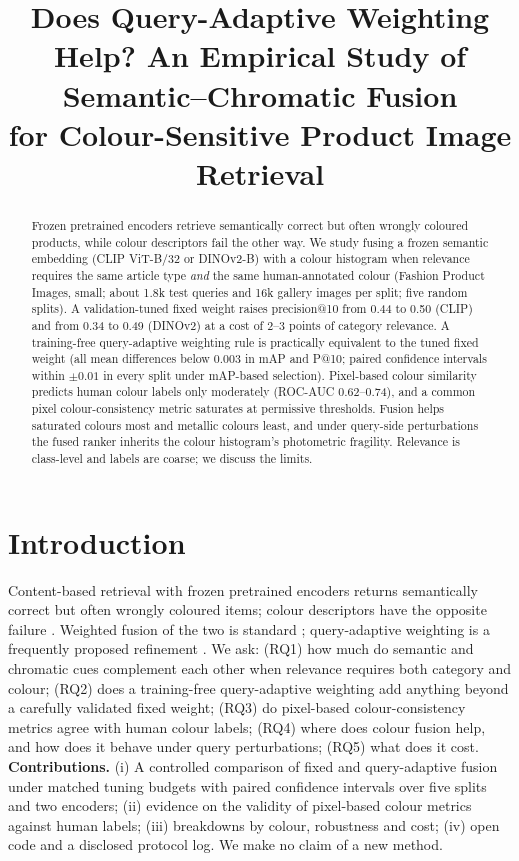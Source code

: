 \documentclass[11pt]{article}
\title{Does Query-Adaptive Weighting Help? An Empirical Study of Semantic--Chromatic Fusion\\for Colour-Sensitive Product Image Retrieval}
\author{\todo{authors}}\date{}
\begin{document}
\maketitle
\begin{abstract}
Frozen pretrained encoders retrieve semantically correct but often wrongly coloured products, while colour descriptors fail the other way. We study fusing a frozen semantic embedding (CLIP ViT-B/32 or DINOv2-B) with a colour histogram when relevance requires the same article type \emph{and} the same human-annotated colour (Fashion Product Images, small; about 1.8k test queries and 16k gallery images per split; five random splits). A validation-tuned fixed weight raises precision@10 from 0.44 to 0.50 (CLIP) and from 0.34 to 0.49 (DINOv2) at a cost of 2--3 points of category relevance. A training-free query-adaptive weighting rule is practically equivalent to the tuned fixed weight (all mean differences below 0.003 in mAP and P@10; paired confidence intervals within $\pm0.01$ in every split under mAP-based selection). Pixel-based colour similarity predicts human colour labels only moderately (ROC-AUC 0.62--0.74), and a common pixel colour-consistency metric saturates at permissive thresholds. Fusion helps saturated colours most and metallic colours least, and under query-side perturbations the fused ranker inherits the colour histogram's photometric fragility. Relevance is class-level and labels are coarse; we discuss the limits.
\end{abstract}

\section{Introduction}
Content-based retrieval with frozen pretrained encoders returns semantically correct but often wrongly coloured items; colour descriptors have the opposite failure \cite{TODO}.
Weighted fusion of the two is standard \cite{TODO}; query-adaptive weighting is a frequently proposed refinement \cite{TODO}.
We ask: (RQ1) how much do semantic and chromatic cues complement each other when relevance requires both category and colour; (RQ2) does a training-free query-adaptive weighting add anything beyond a carefully validated fixed weight; (RQ3) do pixel-based colour-consistency metrics agree with human colour labels; (RQ4) where does colour fusion help, and how does it behave under query perturbations; (RQ5) what does it cost.
\textbf{Contributions.} (i) A controlled comparison of fixed and query-adaptive fusion under matched tuning budgets with paired confidence intervals over five splits and two encoders; (ii) evidence on the validity of pixel-based colour metrics against human labels; (iii) breakdowns by colour, robustness and cost; (iv) open code and a disclosed protocol log. We make no claim of a new method.
\end{document}
